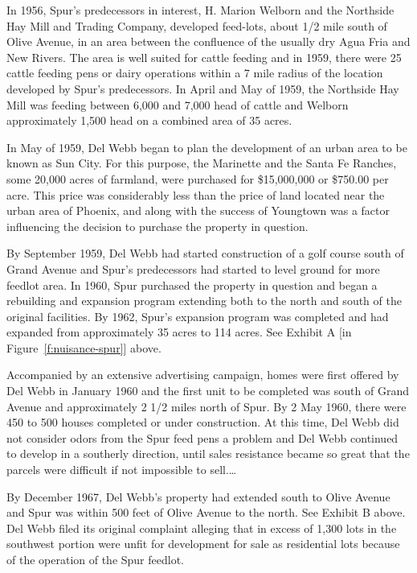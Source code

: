 In 1956, Spur's predecessors in interest, H. Marion Welborn and the Northside
Hay Mill and Trading Company, developed feed-lots, about 1/2 mile south of Olive
Avenue, in an area between the confluence of the usually dry Agua Fria and New
Rivers. The area is well suited for cattle feeding and in 1959, there were 25
cattle feeding pens or dairy operations within a 7 mile radius of the location
developed by Spur's predecessors. In April and May of 1959, the Northside Hay
Mill was feeding between 6,000 and 7,000 head of cattle and Welborn
approximately 1,500 head on a combined area of 35 acres.

In May of 1959, Del Webb began to plan the development of an urban area to be
known as Sun City. For this purpose, the Marinette and the Santa Fe Ranches,
some 20,000 acres of farmland, were purchased for \$15,000,000 or \$750.00 per
acre. This price was considerably less than the price of land located near the
urban area of Phoenix, and along with the success of Youngtown was a factor
influencing the decision to purchase the property in question.

By September 1959, Del Webb had started construction of a golf course south of
Grand Avenue and Spur's predecessors had started to level ground for more
feedlot area. In 1960, Spur purchased the property in question and began a
rebuilding and expansion program extending both to the north and south of the
original facilities. By 1962, Spur's expansion program was completed and had
expanded from approximately 35 acres to 114 acres. See Exhibit A [in
Figure~\ref{f:nuisance-spur}] above.

Accompanied by an extensive advertising campaign, homes were first offered by
Del Webb in January 1960 and the first unit to be completed was south of Grand
Avenue and approximately 2 1/2 miles north of Spur. By 2 May 1960, there were
450 to 500 houses completed or under construction. At this time, Del Webb did
not consider odors from the Spur feed pens a problem and Del Webb continued to
develop in a southerly direction, until sales resistance became so great that
the parcels were difficult if not impossible to sell.\ldots

By December 1967, Del Webb's property had extended south to Olive Avenue and
Spur was within 500 feet of Olive Avenue to the north. See Exhibit B above. Del
Webb filed its original complaint alleging that in excess of 1,300 lots in the
southwest portion were unfit for development for sale as residential lots
because of the operation of the Spur feedlot.

